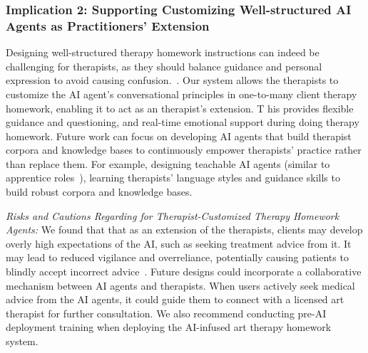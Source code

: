 
\subsubsection{Implication 2: Supporting Customizing Well-structured AI Agents as Practitioners' Extension} 
Designing well-structured therapy homework instructions can indeed be challenging for therapists, as they should balance guidance and personal expression to avoid causing confusion.~\cite{Oewel_2024,Harwood2007}. 
Our system allows the therapists to customize the AI agent's conversational principles in one-to-many client therapy homework, enabling it to act as an therapist's extension. T
his provides flexible guidance and questioning, and real-time emotional support during doing therapy homework.
Future work can focus on developing AI agents that build therapist corpora and knowledge bases to continuously empower therapists' practice rather than replace them. 
For example, designing teachable AI agents (similar to apprentice roles~\cite{chhibber2021towards}), learning therapists' language styles and guidance skills to build robust corpora and knowledge bases.

\textit{Risks and Cautions Regarding for Therapist-Customized Therapy Homework Agents:} We found that that as an extension of the therapists, clients may develop overly high expectations of the AI, such as seeking treatment advice from it. 
It may lead to reduced vigilance and overreliance, potentially causing patients to blindly accept incorrect advice~\cite{mendel2024advice}.
Future designs could incorporate a collaborative mechanism between AI agents and therapists. When users actively seek medical advice from the AI agents, it could guide them to connect with a licensed art therapist for further consultation.
We also recommend conducting pre-AI deployment training when deploying the AI-infused art therapy homework system.


